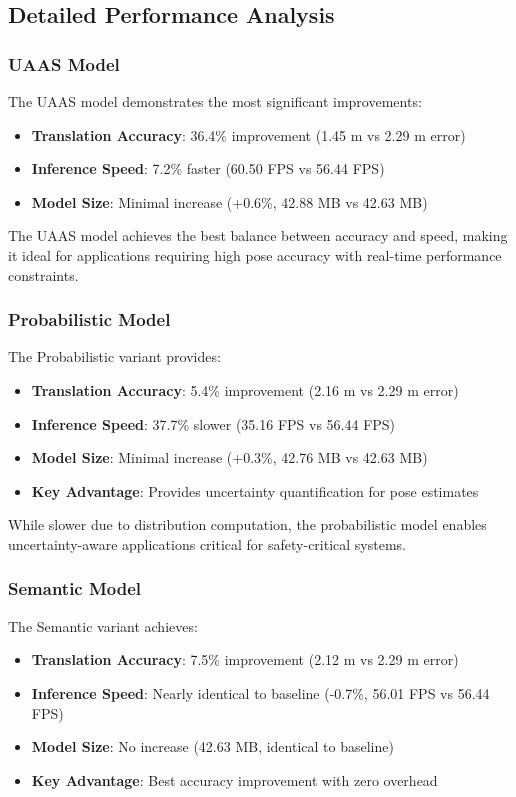 \documentclass[11pt,a4paper]{article}
\begin{document}
\subsection{Detailed Performance Analysis}

\subsubsection{UAAS Model}
The UAAS model demonstrates the most significant improvements:
\begin{itemize}
    \item \textbf{Translation Accuracy}: 36.4\% improvement (1.45 m vs 2.29 m error)
    \item \textbf{Inference Speed}: 7.2\% faster (60.50 FPS vs 56.44 FPS)
    \item \textbf{Model Size}: Minimal increase (+0.6\%, 42.88 MB vs 42.63 MB)
\end{itemize}

The UAAS model achieves the best balance between accuracy and speed, making it ideal for applications requiring high pose accuracy with real-time performance constraints.

\subsubsection{Probabilistic Model}
The Probabilistic variant provides:
\begin{itemize}
    \item \textbf{Translation Accuracy}: 5.4\% improvement (2.16 m vs 2.29 m error)
    \item \textbf{Inference Speed}: 37.7\% slower (35.16 FPS vs 56.44 FPS)
    \item \textbf{Model Size}: Minimal increase (+0.3\%, 42.76 MB vs 42.63 MB)
    \item \textbf{Key Advantage}: Provides uncertainty quantification for pose estimates
\end{itemize}

While slower due to distribution computation, the probabilistic model enables uncertainty-aware applications critical for safety-critical systems.

\subsubsection{Semantic Model}
The Semantic variant achieves:
\begin{itemize}
    \item \textbf{Translation Accuracy}: 7.5\% improvement (2.12 m vs 2.29 m error)
    \item \textbf{Inference Speed}: Nearly identical to baseline (-0.7\%, 56.01 FPS vs 56.44 FPS)
    \item \textbf{Model Size}: No increase (42.63 MB, identical to baseline)
    \item \textbf{Key Advantage}: Best accuracy improvement with zero overhead
\end{itemize}
\end{document}
